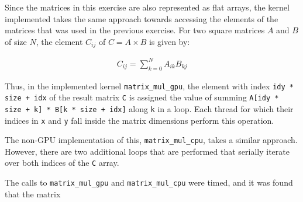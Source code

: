 \documentclass{article}
\newcounter{exercise}
\begin{document}
Since the matrices in this exercise are also represented as flat arrays, the kernel implemented takes the same approach towards accessing the elements of the matrices that was used in the previous exercise. For two square matrices $A$ and $B$ of size $N$, the element $C_{ij}$ of $C = A\times B$ is given by:

\begin{align*}
    C_{ij} = \sum_{k=0}^N A_{ik}B_{kj}
\end{align*}

\noindent Thus, in the implemented kernel \texttt{matrix\_mul\_gpu}, the element with index \texttt{idy * size + idx} of the result matrix \texttt{C} is assigned the value of summing \texttt{A[idy * size + k] * B[k * size + idx]} along \texttt{k} in a loop. Each thread for which their indices in \texttt{x} and \texttt{y} fall inside the matrix dimensions perform this operation.

The non-GPU implementation of this, \texttt{matrix\_mul\_cpu}, takes a similar approach. However, there are two additional loops that are performed that serially iterate over both indices of the \texttt{C} array.

The calls to \texttt{matrix\_mul\_gpu} and \texttt{matrix\_mul\_cpu} were timed, and it was found that the matrix 


\end{document}
